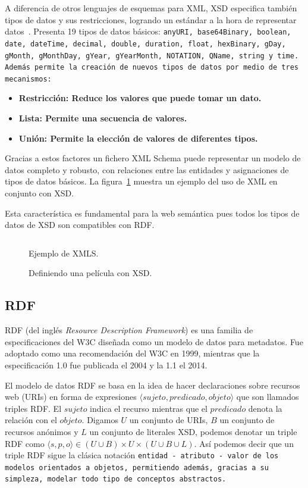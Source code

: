 A diferencia de otros lenguajes de esquemas para XML, XSD especifica también
tipos de datos y sus restricciones, logrando un estándar a la hora de
representar datos~\cite{biron2004xml}. 
Presenta 19 tipos de datos básicos: \tt{anyURI},
\tt{base64Binary}, \tt{boolean}, \tt{date}, \tt{dateTime}, \tt{decimal},
\tt{double}, \tt{duration}, \tt{float}, \tt{hexBinary}, \tt{gDay}, \tt{gMonth},
\tt{gMonthDay}, \tt{gYear}, \tt{gYearMonth}, \tt{NOTATION}, \tt{QName},
\tt{string} y \tt{time}. Además permite la creación de nuevos tipos de datos por
medio de tres mecanismos:
\begin{itemize}
  \item \bf{Restricción:} Reduce los valores que puede tomar un dato.
  \item \bf{Lista:} Permite una secuencia de valores.
  \item \bf{Unión:} Permite la elección de valores de diferentes tipos.
\end{itemize}

Gracias a estos factores un fichero XML Schema puede representar un modelo de
datos completo y robusto, con relaciones entre las entidades y asignaciones de 
tipos de datos básicos. La figura~\ref{fig:xsdex} muestra un ejemplo del uso de
XML en conjunto con XSD.

Esta característica es fundamental para la web semántica pues todos los tipos de
datos de XSD son compatibles con RDF.

\begin{figure}[htpb]
  \centering
  \begin{tabular}{c}
    
  \end{tabular}
  \caption{Ejemplo de XMLS.}
  \vspace{-.25cm}
  \caption*{Definiendo una película con XSD.}
  \label{fig:xsdex}
\end{figure}

\subsection{RDF}\label{sw:rdf}
RDF (del inglés \emph{Resource Description Framework}) es una familia de
especificaciones del W3C diseñada como un modelo de datos para metadatos.
Fue adoptado como una recomendación del W3C en 1999, mientras que la
especificación 1.0 fue publicada el 2004 y la 1.1 el
2014\cite{bikakis2013semantic}.

El modelo de datos RDF se basa en la idea de hacer declaraciones sobre 
recursos web (URIs) en forma de expresiones $\langle sujeto, predicado, objeto
\rangle$ que son llamados triples RDF.
El $sujeto$ indica el recurso mientras que el $predicado$ denota la relación
con el $objeto$.
Digamos $U$ un conjunto de URIs, $B$ un conjunto de recursos anónimos y $L$ un
conjunto de literales XSD, podemos denotar un triple RDF como 
$\langle s,p,o\rangle \in (U\cup B) \times U \times (U\cup B\cup L)$.
Así podemos decir que un triple RDF sigue la clásica notación \tt{entidad} - 
\tt{atributo} - \tt{valor} de los modelos orientados a objetos, permitiendo
además, gracias a su simpleza, modelar todo tipo de conceptos abstractos.

